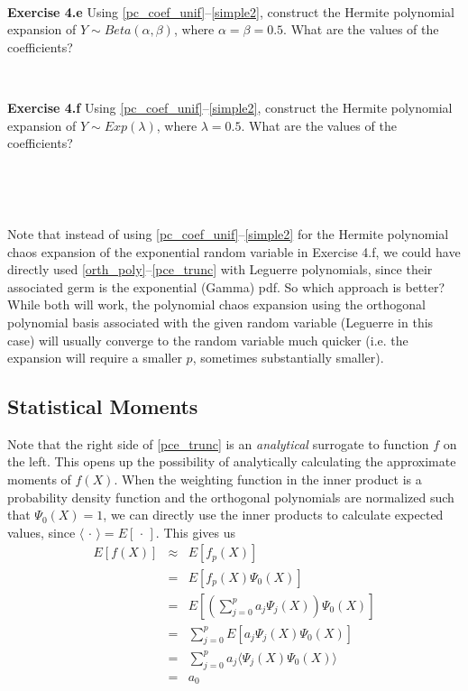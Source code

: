 \documentclass[11pt]{article}
\numberwithin{equation}{section}
\begin{document}
\

\textbf{Exercise 4.e} Using \eqref{pc_coef_unif}--\eqref{simple2}, construct the Hermite polynomial expansion of $Y \sim Beta(\alpha, \beta)$, where $\alpha = \beta = 0.5$. What are the values of the coefficients?

\

\textbf{Exercise 4.f} Using \eqref{pc_coef_unif}--\eqref{simple2}, construct the Hermite polynomial expansion of $Y \sim Exp(\lambda)$, where $\lambda = 0.5$. What are the values of the coefficients?

\

\





Note that instead of using \eqref{pc_coef_unif}--\eqref{simple2} for the Hermite polynomial chaos expansion of the exponential random variable in Exercise 4.f, we could have directly used \eqref{orth_poly}--\eqref{pce_trunc} with Leguerre polynomials, since their associated germ is the exponential (Gamma) pdf. So which approach is better? While both will work, the polynomial chaos expansion using the orthogonal polynomial basis associated with the given random variable (Leguerre in this case) will usually converge to the random variable much quicker (i.e. the expansion will require a smaller $p$, sometimes substantially smaller).






\subsection{Statistical Moments}

Note that the right side of \eqref{pce_trunc} is an {\em analytical} surrogate to function $f$ on the left. This opens up the possibility of analytically calculating the approximate moments of $f(X)$. When the weighting function in the inner product is a probability density function and the orthogonal polynomials are normalized such that $\Psi_0(X) = 1$, we can directly use the inner products to calculate expected values, since $\langle \, \cdot \, \rangle = E[ \, \cdot \, ]$. This gives us
\begin{eqnarray}
E [ f(X) ] & \approx & E [ f_p(X) ] \nonumber \\
& = & E [ f_p(X) \Psi_0(X) ] \nonumber \\
& = & E \left[ \left( \sum_{j = 0}^p a_j \Psi_j(X) \right) \Psi_0(X) \right] \nonumber \\
& = & \sum_{j = 0}^p  E \left[ a_j \Psi_j(X) \Psi_0(X) \right] \nonumber \\
& = & \sum_{j = 0}^p   a_j \langle \Psi_j(X) \Psi_0(X) \rangle  \nonumber \\
& = & a_0 \label{pce_mu}
\end{eqnarray}
\end{document}
